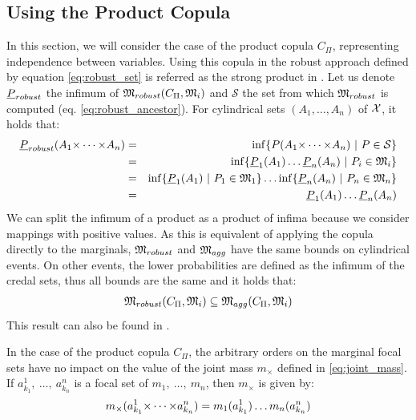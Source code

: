 \subsection{Using the Product Copula}\label{subsection:product_copula}
In this section, we will consider the case of the product copula $C_\Pi$, representing independence between variables. Using this copula in the robust approach defined by equation \eqref{eq:robust_set} is referred as the strong product in \cite{kacprzyk_factorisation_2010}. Let us denote ${\underline{P}}_{robust}$ the infimum of ${\mathfrak{M}}_{robust}(C_\Pi, {\mathfrak{M}}_i)$ and $\mathcal{S}$ the set from which ${\mathfrak{M}}_{robust}$ is computed (eq. \eqref{eq:robust_ancestor}).
For cylindrical sets $(A_1, \dots, A_n)$ of ${\mathcal{X}}$, it holds that:
\begin{eqnarray*}
    {\underline{P}}_{robust}(A_1{\times\dots\times} A_n) &=& \inf\{P(A_1{\times\dots\times} A_n)~|~P\in\mathcal{S}\}\\
    &=&\inf\{{\underline{P}}_1(A_1)\dots{\underline{P}}_n(A_n)~|~P_i\in{\mathfrak{M}}_i\}\\
    &=&\inf\{{\underline{P}}_1(A_1)~|~P_1\in{\mathfrak{M}}_1\}\dots\inf\{{\underline{P}}_n(A_n)~|~P_n\in{\mathfrak{M}}_n\}\\
    &=&{\underline{P}}_1(A_1)\dots{\underline{P}}_n(A_n)
\end{eqnarray*}
We can split the infimum of a product as a product of infima because we consider mappings with positive values. As this is equivalent of applying the copula directly to the marginals, ${\mathfrak{M}}_{robust}$ and ${\mathfrak{M}}_{agg}$ have the same bounds on cylindrical events. On other events, the lower probabilities are defined as the infimum of the credal sets, thus all bounds are the same and it holds that:
\begin{eqnarray}
    {\mathfrak{M}}_{robust}(C_\Pi, {\mathfrak{M}}_i)\subseteq{\mathfrak{M}}_{agg}(C_\Pi, {\mathfrak{M}}_i)
\end{eqnarray}
This result can also be found in \cite{couso_survey_2000}.
\begin{proposition}
    In the case of the product copula $C_\Pi$, the arbitrary orders on the marginal focal sets have no impact on the value of the joint mass $m_\times$ defined in \eqref{eq:joint_mass}. If $a^1_{k_1}, ~\dots, ~a^n_{k_n}$ is a focal set of $m_1, ~\dots, ~m_n$, then $m_\times$ is given by:
    \begin{eqnarray}\label{eq:joint_mass_product}
        m_\times(a^1_{k_1}{\times\dots\times} a^n_{k_n}) = m_1(a^1_{k_1})\dots m_n(a^n_{k_n})
    \end{eqnarray}
\end{proposition}

